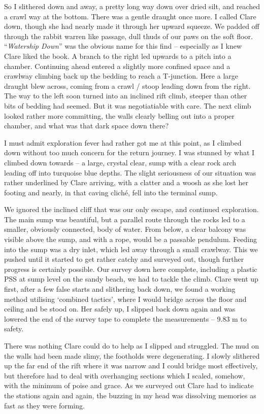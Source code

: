 So I slithered down and away, a pretty long way down over dried silt,
and reached a crawl way at the bottom. There was a gentle draught once
more. I called Clare down, though she had nearly made it through her
upward squeeze. We padded off through the rabbit warren like passage,
dull thuds of our paws on the soft floor. ``\emph{Watership Down}'' was
the obvious name for this find -- especially as I knew Clare liked the
book. A branch to the right led upwards to a pitch into a chamber.
Continuing ahead entered a slightly more confined space and a crawlway
climbing back up the bedding to reach a T-junction. Here a large draught
blew across, coming from a crawl / stoop leading down from the right.
The way to the left soon turned into an inclined rift climb, steeper
than other bits of bedding had seemed. But it was negotiatiable with
care. The next climb looked rather more committing, the walls clearly
belling out into a proper chamber, and what was that dark space down
there?

I must admit exploration fever had rather got me at this point, as I
climbed down without too much concern for the return journey. I was
stunned by what I climbed down towards -- a large, crystal clear, sump
with a clear rock arch leading off into turquoise blue depths. The
slight seriousness of our situation was rather underlined by Clare
arriving, with a clatter and a woosh as she lost her footing and nearly,
in that caving cliché, fell into the terminal sump.

We ignored the inclined cliff that was our only escape, and continued
exploration. The main sump was beautiful, but a parallel route through
the rocks led to a smaller, obviously connected, body of water. From
below, a clear balcony was visible above the sump, and with a rope,
would be a passable pendulum. Feeding into the sump was a dry inlet,
which led away through a small crawlway. This we pushed until it started
to get rather catchy and surveyed out, though further progress is
certainly possible. Our survey down here complete, including a plastic
PSS at sump level on the sandy beach, we had to tackle the climb. Clare
went up first, after a few false starts and slithering back down, we
found a working method utilising `combined tactics', where I would
bridge across the floor and ceiling and be stood on. Her safely up, I
slipped back down again and was lowered the end of the survey tape to
complete the measurements -- 9.83 m to safety.

There was nothing Clare could do to help as I slipped and struggled. The
mud on the walls had been made slimy, the footholds were degenerating. I
slowly slithered up the far end of the rift where it was narrow and I
could bridge most effectively, but therefore had to deal with
overhanging sections which I scaled, somehow, with the minimum of poise
and grace. As we surveyed out Clare had to indicate the stations again
and again, the buzzing in my head was dissolving memories as fast as
they were forming.

